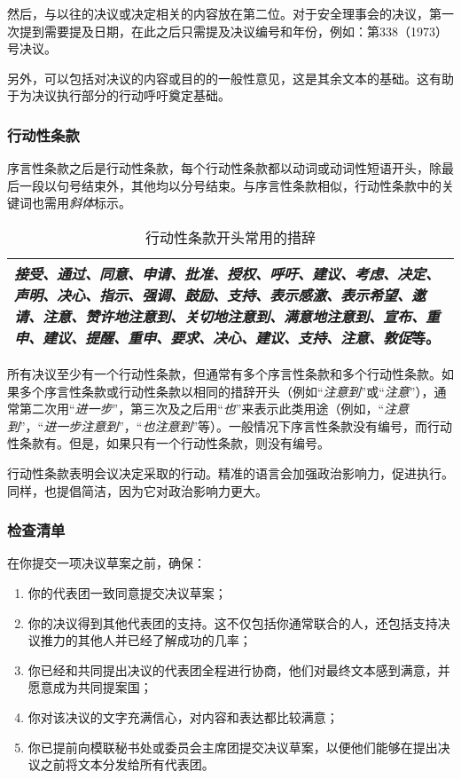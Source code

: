 \documentclass[a4paper,openany]{book}
\begin{document}
然后，与以往的决议或决定相关的内容放在第二位。对于安全理事会的决议，第一次提到需要提及日期，在此之后只需提及决议编号和年份，例如：第338（1973）号决议。

另外，可以包括对决议的内容或目的的一般性意见，这是其余文本的基础。这有助于为决议执行部分的行动呼吁奠定基础。

\subsubsection{行动性条款}

序言性条款之后是行动性条款，每个行动性条款都以动词或动词性短语开头，除最后一段以句号结束外，其他均以分号结束。与序言性条款相似，行动性条款中的关键词也需用\textit{斜体}标示。

\begin{table}[ht]
\setlength{\belowcaptionskip}{5pt}
\caption{行动性条款开头常用的措辞}
\centering
\begin{tabular}{| p{11cm} |}
\hline
\textit{接受、通过、同意、申请、批准、授权、呼吁、建议、考虑、决定、声明、决心、指示、强调、鼓励、支持、表示感激、表示希望、邀请、注意、赞许地注意到、关切地注意到、满意地注意到、宣布、重申、建议、提醒、重申、要求、决心、建议、支持、注意、敦促}等。\\
\hline
\end{tabular}
\end{table}


所有决议至少有一个行动性条款，但通常有多个序言性条款和多个行动性条款。如果多个序言性条款或行动性条款以相同的措辞开头（例如“\textit{注意到}”或“\textit{注意}”），通常第二次用“\textit{进一步}”，第三次及之后用“\textit{也}”来表示此类用途（例如，“\textit{注意到}”，“\textit{进一步注意到}”，“\textit{也注意到}”等）。一般情况下序言性条款没有编号，而行动性条款有。但是，如果只有一个行动性条款，则没有编号。

行动性条款表明会议决定采取的行动。精准的语言会加强政治影响力，促进执行。同样，也提倡简洁，因为它对政治影响力更大。

\subsubsection{检查清单}

在你提交一项决议草案之前，确保：

\begin{enumerate}
\item 你的代表团一致同意提交决议草案；
\item 你的决议得到其他代表团的支持。这不仅包括你通常联合的人，还包括支持决议推力的其他人并已经了解成功的几率；
\item 你已经和共同提出决议的代表团全程进行协商，他们对最终文本感到满意，并愿意成为共同提案国；
\item 你对该决议的文字充满信心，对内容和表达都比较满意；
\item 你已提前向模联秘书处或委员会主席团提交决议草案，以便他们能够在提出决议之前将文本分发给所有代表团。
\end{enumerate}
\end{document}

